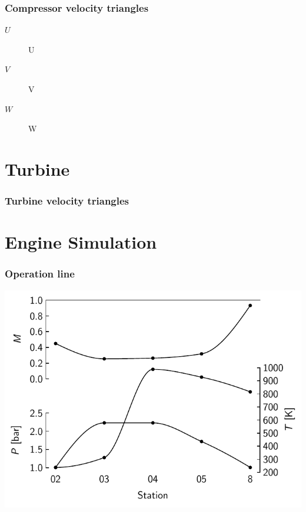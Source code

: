 \documentclass{beamer}
\begin{document}
\begin{frame}
\frametitle{Compressor velocity triangles}

\begin{description}
    \item[$U$] \acl{U}
    \item[$V$] \acl{V}
    \item[$W$] \acl{W}
\end{description}
\end{frame}

\section{Turbine}

\begin{frame}
\frametitle{Turbine velocity triangles}

\end{frame}


\section{Engine Simulation}
\begin{frame}
\frametitle{Operation line}
\end{frame}

\begin{frame}
\includegraphics[width=\textwidth]{fig/stations1000K}
\end{frame}
\end{document}
